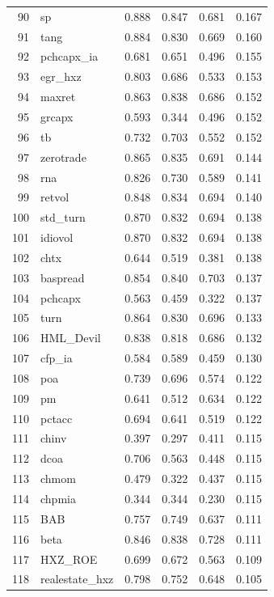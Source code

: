 \documentclass[12pt]{article}
\begin{document}
\begin{footnotesize}
\begin{longtable}{rl|c|c|c|c}
		90 & sp & 0.888 & 0.847 & 0.681 & 0.167 \\ 
		91 & tang & 0.884 & 0.830 & 0.669 & 0.160 \\ 
		92 & pchcapx\_ia & 0.681 & 0.651 & 0.496 & 0.155 \\ 
		93 & egr\_hxz & 0.803 & 0.686 & 0.533 & 0.153 \\ 
		94 & maxret & 0.863 & 0.838 & 0.686 & 0.152 \\ 
		95 & grcapx & 0.593 & 0.344 & 0.496 & 0.152 \\ 
		96 & tb & 0.732 & 0.703 & 0.552 & 0.152 \\ 
		97 & zerotrade & 0.865 & 0.835 & 0.691 & 0.144 \\ 
		98 & rna & 0.826 & 0.730 & 0.589 & 0.141 \\ 
		99 & retvol & 0.848 & 0.834 & 0.694 & 0.140 \\ 
		100 & std\_turn & 0.870 & 0.832 & 0.694 & 0.138 \\ 
		101 & idiovol & 0.870 & 0.832 & 0.694 & 0.138 \\ 
		102 & chtx & 0.644 & 0.519 & 0.381 & 0.138 \\ 
		103 & baspread & 0.854 & 0.840 & 0.703 & 0.137 \\ 
		104 & pchcapx & 0.563 & 0.459 & 0.322 & 0.137 \\ 
		105 & turn & 0.864 & 0.830 & 0.696 & 0.133 \\ 
		106 & HML\_Devil & 0.838 & 0.818 & 0.686 & 0.132 \\ 
		107 & cfp\_ia & 0.584 & 0.589 & 0.459 & 0.130 \\ 
		108 & poa & 0.739 & 0.696 & 0.574 & 0.122 \\ 
		109 & pm & 0.641 & 0.512 & 0.634 & 0.122 \\ 
		110 & pctacc & 0.694 & 0.641 & 0.519 & 0.122 \\ 
		111 & chinv & 0.397 & 0.297 & 0.411 & 0.115 \\ 
		112 & dcoa & 0.706 & 0.563 & 0.448 & 0.115 \\ 
		113 & chmom & 0.479 & 0.322 & 0.437 & 0.115 \\ 
		114 & chpmia & 0.344 & 0.344 & 0.230 & 0.115 \\ 
		115 & BAB & 0.757 & 0.749 & 0.637 & 0.111 \\ 
		116 & beta & 0.846 & 0.838 & 0.728 & 0.111 \\ 
		117 & HXZ\_ROE & 0.699 & 0.672 & 0.563 & 0.109 \\ 
		118 & realestate\_hxz & 0.798 & 0.752 & 0.648 & 0.105 \\ 

\end{longtable}
\end{footnotesize}
\end{document}
